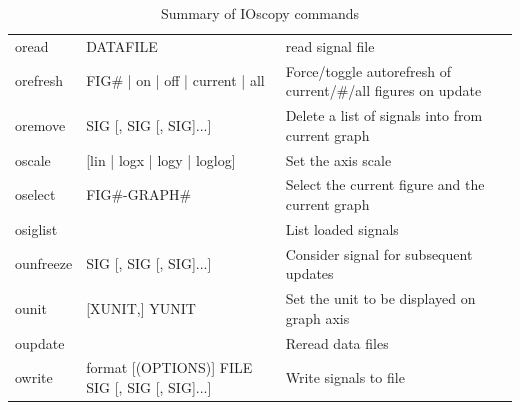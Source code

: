 \documentclass[a4paper,11pt]{report}
\begin{document}
\begin{landscape}
\begin{table}[htbp]
\begin{tabular}{lll}
      oread & DATAFILE &read signal file\\
      orefresh &  FIG\# | on | off | current | all& Force/toggle autorefresh of current/\#/all figures on update\\
      oremove & SIG [, SIG [, SIG]...] &Delete a list of signals into from current graph\\
      oscale & [lin | logx | logy | loglog] &Set the axis scale\\
      oselect & FIG\#-GRAPH\# &Select the current figure and the current graph\\
      osiglist & &List loaded signals\\
      ounfreeze & SIG [, SIG [, SIG]...] &Consider signal for subsequent updates\\
      ounit & [XUNIT,] YUNIT &Set the unit to be displayed on graph axis\\
      oupdate & &Reread data files\\
      owrite & format [(OPTIONS)] FILE SIG [, SIG [, SIG]...] &Write signals to file\\
      \hline
    \end{tabular}
    \caption{Summary of IOscopy commands}
    \label{tab:cmds:summary}
  \end{table}
\end{landscape}
\end{document}
